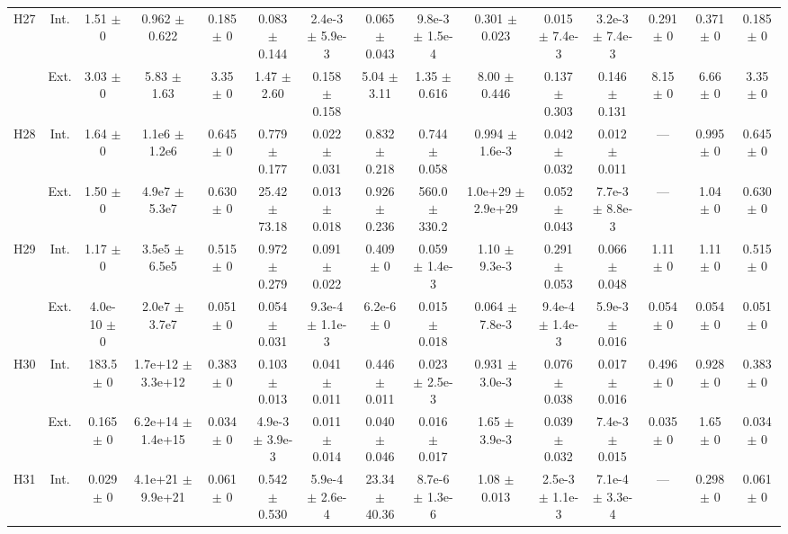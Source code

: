 \begin{table}[htbp]
{\begin{tabular}{@{}ccccccccccccccc@{}}
\cline{2-15}
\multirow{2}{*}{H27} & Int. & 1.51 $\pm$ 0 & 0.962 $\pm$ 0.622 & 0.185 $\pm$ 0 & 0.083 $\pm$ 0.144 & 2.4e-3 $\pm$ 5.9e-3 & 0.065 $\pm$ 0.043 & 9.8e-3 $\pm$ 1.5e-4 & 0.301 $\pm$ 0.023 & 0.015 $\pm$ 7.4e-3 & 3.2e-3 $\pm$ 7.4e-3 & 0.291 $\pm$ 0 & 0.371 $\pm$ 0 & 0.185 $\pm$ 0 \\
 & Ext. & 3.03 $\pm$ 0 & 5.83 $\pm$ 1.63 & 3.35 $\pm$ 0 & 1.47 $\pm$ 2.60 & 0.158 $\pm$ 0.158 & 5.04 $\pm$ 3.11 & 1.35 $\pm$ 0.616 & 8.00 $\pm$ 0.446 & 0.137 $\pm$ 0.303 & 0.146 $\pm$ 0.131 & 8.15 $\pm$ 0 & 6.66 $\pm$ 0 & 3.35 $\pm$ 0 \\
\cline{2-15}
\multirow{2}{*}{H28} & Int. & 1.64 $\pm$ 0 & 1.1e6 $\pm$ 1.2e6 & 0.645 $\pm$ 0 & 0.779 $\pm$ 0.177 & 0.022 $\pm$ 0.031 & 0.832 $\pm$ 0.218 & 0.744 $\pm$ 0.058 & 0.994 $\pm$ 1.6e-3 & 0.042 $\pm$ 0.032 & 0.012 $\pm$ 0.011 & --- & 0.995 $\pm$ 0 & 0.645 $\pm$ 0 \\
 & Ext. & 1.50 $\pm$ 0 & 4.9e7 $\pm$ 5.3e7 & 0.630 $\pm$ 0 & 25.42 $\pm$ 73.18 & 0.013 $\pm$ 0.018 & 0.926 $\pm$ 0.236 & 560.0 $\pm$ 330.2 & 1.0e+29 $\pm$ 2.9e+29 & 0.052 $\pm$ 0.043 & 7.7e-3 $\pm$ 8.8e-3 & --- & 1.04 $\pm$ 0 & 0.630 $\pm$ 0 \\
\cline{2-15}
\multirow{2}{*}{H29} & Int. & 1.17 $\pm$ 0 & 3.5e5 $\pm$ 6.5e5 & 0.515 $\pm$ 0 & 0.972 $\pm$ 0.279 & 0.091 $\pm$ 0.022 & 0.409 $\pm$ 0 & 0.059 $\pm$ 1.4e-3 & 1.10 $\pm$ 9.3e-3 & 0.291 $\pm$ 0.053 & 0.066 $\pm$ 0.048 & 1.11 $\pm$ 0 & 1.11 $\pm$ 0 & 0.515 $\pm$ 0 \\
 & Ext. & 4.0e-10 $\pm$ 0 & 2.0e7 $\pm$ 3.7e7 & 0.051 $\pm$ 0 & 0.054 $\pm$ 0.031 & 9.3e-4 $\pm$ 1.1e-3 & 6.2e-6 $\pm$ 0 & 0.015 $\pm$ 0.018 & 0.064 $\pm$ 7.8e-3 & 9.4e-4 $\pm$ 1.4e-3 & 5.9e-3 $\pm$ 0.016 & 0.054 $\pm$ 0 & 0.054 $\pm$ 0 & 0.051 $\pm$ 0 \\
\cline{2-15}
\multirow{2}{*}{H30} & Int. & 183.5 $\pm$ 0 & 1.7e+12 $\pm$ 3.3e+12 & 0.383 $\pm$ 0 & 0.103 $\pm$ 0.013 & 0.041 $\pm$ 0.011 & 0.446 $\pm$ 0.011 & 0.023 $\pm$ 2.5e-3 & 0.931 $\pm$ 3.0e-3 & 0.076 $\pm$ 0.038 & 0.017 $\pm$ 0.016 & 0.496 $\pm$ 0 & 0.928 $\pm$ 0 & 0.383 $\pm$ 0 \\
 & Ext. & 0.165 $\pm$ 0 & 6.2e+14 $\pm$ 1.4e+15 & 0.034 $\pm$ 0 & 4.9e-3 $\pm$ 3.9e-3 & 0.011 $\pm$ 0.014 & 0.040 $\pm$ 0.046 & 0.016 $\pm$ 0.017 & 1.65 $\pm$ 3.9e-3 & 0.039 $\pm$ 0.032 & 7.4e-3 $\pm$ 0.015 & 0.035 $\pm$ 0 & 1.65 $\pm$ 0 & 0.034 $\pm$ 0 \\
\cline{2-15}
\multirow{2}{*}{H31} & Int. & 0.029 $\pm$ 0 & 4.1e+21 $\pm$ 9.9e+21 & 0.061 $\pm$ 0 & 0.542 $\pm$ 0.530 & 5.9e-4 $\pm$ 2.6e-4 & 23.34 $\pm$ 40.36 & 8.7e-6 $\pm$ 1.3e-6 & 1.08 $\pm$ 0.013 & 2.5e-3 $\pm$ 1.1e-3 & 7.1e-4 $\pm$ 3.3e-4 & --- & 0.298 $\pm$ 0 & 0.061 $\pm$ 0 \\

\end{tabular}}
\end{table}
